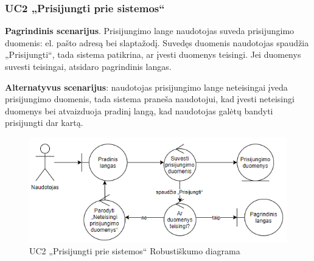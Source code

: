 \documentclass{VUMIFPSbakalaurinis}
\begin{document}
\subsubsection{UC2 „Prisijungti prie sistemos“}
\textbf{Pagrindinis scenarijus}. Prisijungimo lange naudotojas suveda prisijungimo duomenis: el. pašto adresą bei slaptažodį. Suvedęs duomenis naudotojas spaudžia „Prisijungti“, tada sistema patikrina, ar įvesti duomenys teisingi. Jei duomenys suvesti teisingai, atsidaro pagrindinis langas.
\par \textbf{Alternatyvus scenarijus}: naudotojas prisijungimo lange neteisingai įveda prisijungimo duomenis, tada sistema praneša naudotojui, kad įvesti neteisingi duomenys bei atvaizduoja pradinį langą, kad naudotojas galėtų bandyti prisijungti dar kartą.

\begin{figure}[H]
	\centering
	\includegraphics[scale=0.6]{img/Robustness/UC2}
	\caption{UC2 „Prisijungti prie sistemos“ Robustiškumo diagrama}
	\label{img:uc2rob}
\end{figure}
\end{document}
